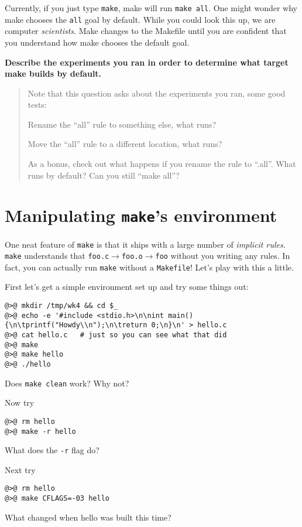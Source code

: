 \documentclass{article}
\begin{document}
Currently, if you just type \texttt{make}, make will run \texttt{make all}.
One might wonder why make chooses the \texttt{all} goal by default.
While you could look this up, we are computer \emph{scientists}.
Make changes to the Makefile until you are confident that you understand how
make chooses the default goal.

\textbf{Describe the experiments you ran in order to determine what target
  make builds by default.}
\begin{quote}
  \color{violet}
  Note that this question asks about the experiments you ran, some good tests:

  Rename the ``all'' rule to something else, what runs?

  Move the ``all'' rule to a different location, what runs?

  As a bonus, check out what happens if you rename the rule to ``.all''. What
  runs by default? Can you still ``make all''?
\end{quote}

\newpage

\section{Manipulating \texttt{make}'s environment}

One neat feature of \texttt{make} is that it ships with a large number of
\emph{implicit rules}. \texttt{make} understands that
\texttt{foo.c}$\rightarrow$\texttt{foo.o}$\rightarrow$\texttt{foo} without you
writing any rules. In fact, you can actually run \texttt{make} without a
\texttt{Makefile}! Let's play with this a little.


First let's get a simple environment set up and try some things out:
\begin{lstlisting}
@>@ mkdir /tmp/wk4 && cd $_
@>@ echo -e '#include <stdio.h>\n\nint main() {\n\tprintf("Howdy\\n");\n\treturn 0;\n}\n' > hello.c
@>@ cat hello.c   # just so you can see what that did
@>@ make
@>@ make hello
@>@ ./hello
\end{lstlisting}
Does \texttt{make clean} work? Why not?

Now try
\begin{lstlisting}
@>@ rm hello
@>@ make -r hello
\end{lstlisting}
What does the \texttt{-r} flag do?

Next try
\begin{lstlisting}
@>@ rm hello
@>@ make CFLAGS=-03 hello
\end{lstlisting}
What changed when hello was built this time?
\end{document}
